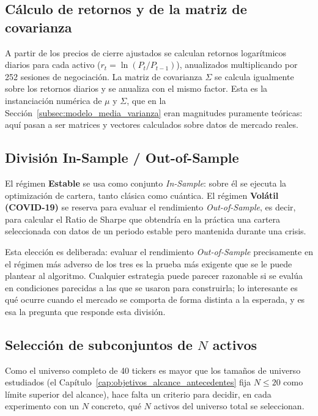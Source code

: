 \subsection{Cálculo de retornos y de la matriz de covarianza}

A partir de los precios de cierre ajustados se calculan retornos logarítmicos diarios para cada activo ($r_t = \ln(P_t / P_{t-1})$), anualizados multiplicando por 252 sesiones de negociación. La matriz de covarianza $\Sigma$ se calcula igualmente sobre los retornos diarios y se anualiza con el mismo factor. Esta es la instanciación numérica de $\mu$ y $\Sigma$, que en la Sección~\ref{subsec:modelo_media_varianza} eran magnitudes puramente teóricas: aquí pasan a ser matrices y vectores calculados sobre datos de mercado reales.

\subsection{División In-Sample / Out-of-Sample}
\label{sec:is-oos}

El régimen \textbf{Estable} se usa como conjunto \textit{In-Sample}: sobre él se ejecuta la optimización de cartera, tanto clásica como cuántica. El régimen \textbf{Volátil (COVID-19)} se reserva para evaluar el rendimiento \textit{Out-of-Sample}, es decir, para calcular el Ratio de Sharpe que obtendría en la práctica una cartera seleccionada con datos de un periodo estable pero mantenida durante una crisis.

Esta elección es deliberada: evaluar el rendimiento \textit{Out-of-Sample} precisamente en el régimen más adverso de los tres es la prueba más exigente que se le puede plantear al algoritmo. Cualquier estrategia puede parecer razonable si se evalúa en condiciones parecidas a las que se usaron para construirla; lo interesante es qué ocurre cuando el mercado se comporta de forma distinta a la esperada, y es esa la pregunta que responde esta división.

\subsection{Selección de subconjuntos de $N$ activos}

Como el universo completo de 40 tickers es mayor que los tamaños de universo estudiados (el Capítulo~\ref{cap:objetivos_alcance_antecedentes} fija $N \leq 20$ como límite superior del alcance), hace falta un criterio para decidir, en cada experimento con un $N$ concreto, qué $N$ activos del universo total se seleccionan.

